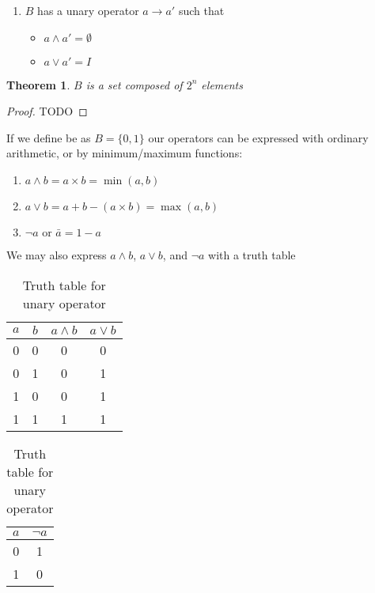 \documentclass{article}
\newtheorem*{theorem}{Theorem}
\begin{document}
\begin{enumerate}
	      (universal set)
	      \begin{itemize}
	      	\item $\emptyset \wedge a = \emptyset$
	      	\item $\emptyset \vee a = a$
	      	\item $I \wedge a = a$
	      	\item $I \vee a = I$
	      \end{itemize}
	\item $B$ has a unary operator $a\rightarrow a'$ such that
	      \begin{itemize}
	      	\item $a \wedge a' = \emptyset$
	      	\item $a \vee a' = I$
	      \end{itemize}
\end{enumerate}

\begin{theorem}
  $B$ is a set composed of $2^n$ elements
\end{theorem}
\begin{proof}
  TODO
\end{proof}
If we define be as $B = \{0,1\}$ our operators can be expressed with ordinary
arithmetic, or by minimum/maximum functions\cite{algebrainterp}:

\begin{enumerate}
	\item $a \wedge b = a \times b = \min(a,b)$
	\item $a \vee b = a + b - (a \times b) = \max(a,b)$
	\item $\neg a\text{ or }\bar{a} = 1 - a$
\end{enumerate}
We may also express $a \wedge b$, $a \vee b$, and $\neg a$ with a truth table

\begin{table}
	\parbox{.45\linewidth}{
		\centering
		\begin{tabular}{@{}c c c c @{}}
			\toprule
			$a$ & $b$ & $a \wedge b$ & $a \vee b$ \\ \toprule
			0   & 0   & 0            & 0          \\ \midrule
			0   & 1   & 0            & 1          \\ \midrule
			1   & 0   & 0            & 1          \\ \midrule
			1   & 1   & 1            & 1          \\ \bottomrule
		\end{tabular}
		\caption{Truth table for binary operators}
	}
	\hfill
	\parbox{.45\linewidth}{
		\centering
		\begin{tabular}{@{} c c @{}}
			\toprule
			$a$ & $\neg a$ \\ \toprule
			0   & 1        \\ \midrule
			1   & 0        \\ \bottomrule
		\end{tabular}
		\caption{Truth table for unary operator }
	}
\end{table}
\end{document}
